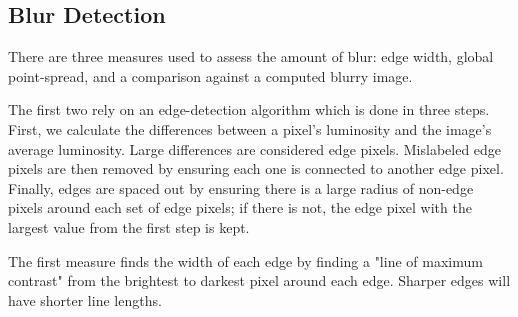 \documentclass{article}
\begin{document}





\subsection{Blur Detection}
There are three measures used to assess the amount of blur: edge width, global point-spread, and a comparison against a computed blurry image.

The first two rely on an edge-detection algorithm which is done in three steps. First, we calculate the differences between a pixel's luminosity and the image's average luminosity. Large differences are considered edge pixels. Mislabeled edge pixels are then removed by ensuring each one is connected to another edge pixel. Finally, edges are spaced out by ensuring there is a large radius of non-edge pixels around each set of edge pixels; if there is not, the edge pixel with the largest value from the first step is kept. %

The first measure finds the width of each edge by finding a "line of maximum contrast" from the brightest to darkest pixel around each edge. Sharper edges will have shorter line lengths.
\end{document}

